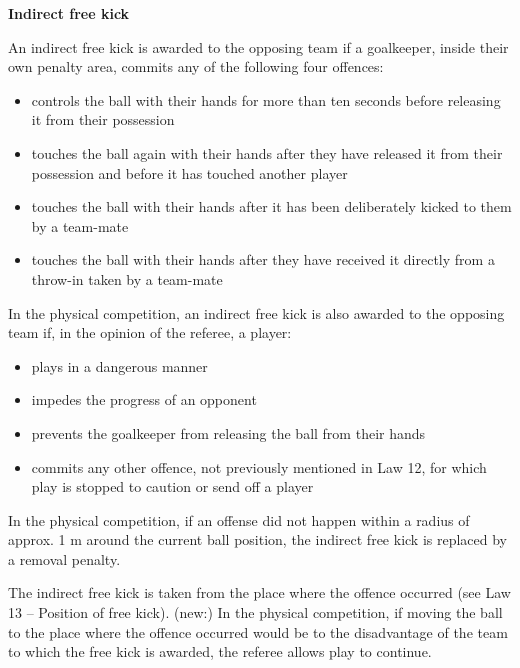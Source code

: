 \bigskip

{\bfseries Indirect free kick}

\headlinebox

An indirect free kick is awarded to the opposing team if a goalkeeper, inside their own penalty area, commits any of the following four offences: 

\begin{itemize}
\item controls the ball with their hands for more than ten seconds before releasing it from their possession
\item touches the ball again with their hands after they have released it from their possession and before it has touched another player
\item touches the ball with their hands after it has been deliberately kicked to them by a team-mate
\item touches the ball with their hands after they have received it directly from a throw-in taken by a team-mate
\end{itemize}

\bigskip

In the physical competition, an indirect free kick is also awarded to the opposing team if, in the opinion of the referee, a player:

\begin{itemize}
\item plays in a dangerous manner
\item impedes the progress of an opponent
\item prevents the goalkeeper from releasing the ball from their hands
\item commits any other offence, not previously mentioned in Law 12, for which play is stopped to caution or send off a player
\end{itemize}

\bigskip


In the physical competition, if an offense did not happen within a radius of approx. 1 m
around the current ball position, the indirect free kick is replaced by a
removal penalty.


  \bigskip


The indirect free kick is taken from the place where the offence occurred (see Law 13 -- Position of free kick).
(new:) In the physical competition, if moving the ball to the place where the offence occurred would be to the disadvantage of the team to which the free kick is awarded, the referee allows play to continue.

